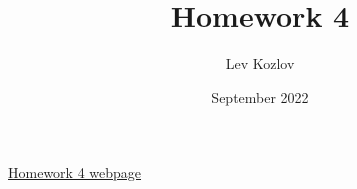 \documentclass{article}
\title{Homework 4}
\author{Lev Kozlov}
\date{September 2022}
\begin{document}
\maketitle

\href{https://lvjonok.github.io/f22-theoretical-mechanics/2022/09/18/homework3.html}{Homework 4 webpage}




\newpage


\end{document}
